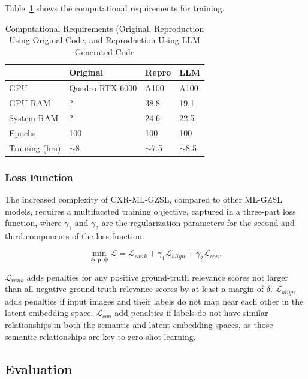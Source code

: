 \documentclass[letterpaper]{article} %
\begin{document}
Table~\ref{tab:compute} shows the computational requirements for training.

\begin{table}[h!]
\centering
\begin{tabular}{|l|l|l|l|}
\hline
\textbf{} & \textbf{Original} & \textbf{Repro} & \textbf{LLM} \\
\hline
GPU & Quadro RTX 6000 & A100 & A100 \\
GPU RAM & ? & 38.8 & 19.1 \\
System RAM & ? & 24.6 & 22.5 \\
Epochs & 100 & 100 & 100 \\
Training (hrs) & $\sim$8 & $\sim$7.5 & $\sim$8.5 \\
\hline
\end{tabular}
\caption{Computational Requirements (Original, Reproduction Using Original Code, and Reproduction Using LLM Generated Code}
\label{tab:compute}
\end{table}

\subsubsection{Loss Function}

The increased complexity of CXR-ML-GZSL, compared to other ML-GZSL models, requires a multifaceted training objective, captured in a three-part loss function, where $\gamma_1$ and $\gamma_2$ are the regularization parameters for the second and third components of the loss function.

\begin{equation}
    \min_{\boldsymbol{\phi} ,\boldsymbol{\rho} ,\boldsymbol{\psi}} \mathcal{L} = \mathcal{L}_{{rank}} +\gamma_{1} \mathcal{L}_{align} +\gamma_{2} \mathcal{L}_{con},
    \label{eqn:full_loss}
\end{equation}

\texorpdfstring{$\mathcal{L}_{rank}$}: adds penalties for any positive ground-truth relevance scores not larger than all negative ground-truth relevance scores by at least a margin of $\delta$. \texorpdfstring{$\mathcal{L}_{align}$}: adds penalties if input images and their labels do not map near each other in the latent embedding space. \texorpdfstring{$\mathcal{L}_{con}$}: add penalties if labels do not have similar relationships in both the semantic and latent embedding spaces, as those semantic relationships are key to zero shot learning.

\subsection{Evaluation}
\end{document}
